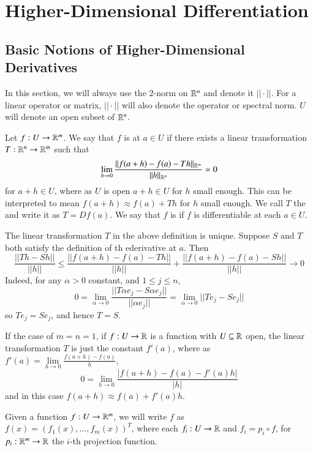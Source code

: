 \chapter{Higher-Dimensional Differentiation}


\section{Basic Notions of Higher-Dimensional Derivatives}

In this section, we will always use the $2$-norm on $\mathbb R^n$ and denote it $||\cdot||$. For a linear operator or matrix, $||\cdot||$ will also denote the operator or spectral norm. $U$ will denote an open subset of $\mathbb R^n$.

\begin{defn}
    Let $f:U\rightarrow \mathbb R^m$. We say that $f$ is  at $a \in U$ if there exists a linear transformation $T:\mathbb R^n\rightarrow \mathbb R^m$ such that $$\lim\limits_{h\rightarrow 0}\frac{||f(a+h) - f(a) - Th||_{\mathbb R^m}}{||h||_{\mathbb R^n}} = 0$$ for $a+h \in U$, where as $U$ is open $a+h \in U$ for $h$ small enough. This can be interpreted to mean $f(a+h) \approx f(a)+Th$ for $h$ small enough. We call $T$ the  and write it as $T = Df(a)$. We say that $f$ is  if $f$ is differentiable at each $a \in U$.
\end{defn}

\begin{rmk}
    The linear transformation $T$ in the above definition is unique. Suppose $S$ and $T$ both satisfy the definition of th ederivative at $a$. Then $$\frac{||Th - Sh||}{||h||} \leq \frac{||f(a+h) - f(a) - Th||}{||h||} + \frac{||f(a+h)-f(a)-Sh||}{||h||}\rightarrow 0$$ Indeed, for any $\alpha > 0$ constant, and $1 \leq j \leq n$, $$0 = \lim\limits_{\alpha\rightarrow 0}\frac{||T\alpha e_j - S\alpha e_j||}{||\alpha e_j||} = \lim\limits_{\alpha\rightarrow 0}||T e_j - S e_j||$$ so $T e_j = Se_j$, and hence $T = S$.
\end{rmk}

If the case of $m = n =1$, if $f:U\rightarrow \mathbb R$ is a function with $U \subseteq \mathbb R$ open, the linear transformation $T$ is just the constant $f'(a)$, where as $f'(a) = \lim\limits_{h\rightarrow 0}\frac{f(a+h)-f(a)}{h}$, $$0 = \lim\limits_{h\rightarrow 0}\frac{|f(a+h) - f(a) - f'(a)h|}{|h|}$$ and in this case $f(a+h) \approx f(a) + f'(a)h$.

\begin{nota}
    Given a function $f:U\rightarrow \mathbb R^m$, we will write $f$ as $f(x) = (f_1(x),...,f_m(x))^T$, where each $f_i:U\rightarrow \mathbb R$ and $f_i = p_i\circ f$, for $p_i:\mathbb R^m\rightarrow \mathbb R$ the $i$-th projection function.
\end{nota}

